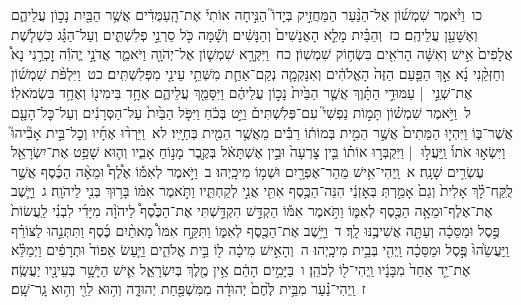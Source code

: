 \documentclass[18pt]{article}
\newcommand{\kri}[1]{\Afootnote{#1}}	%
\begin{document}
 {\loc כו~}וַיֹּ֨אמֶר שִׁמְשׁ֜וֹן אֶל־הַנַּ֨עַר הַמַּחֲזִ֣יק בְּיָדוֹ֮ הַנִּ֣יחָה אוֹתִי֒  \edtext{(והימשני)}{\kri{קרי: וַהֲמִישֵׁ֙נִי֙}}  אֶת־הָֽעַמֻּדִ֔ים אֲשֶׁ֥ר הַבַּ֖יִת נָכ֣וֹן עֲלֵיהֶ֑ם וְאֶשָּׁעֵ֖ן עֲלֵיהֶֽם׃ \startlock
 {\loc כז~}וְהַבַּ֗יִת מָלֵ֤א הָאֲנָשִׁים֙ וְהַנָּשִׁ֔ים וְשָׁ֕מָּה כֹּ֖ל סַרְנֵ֣י פְלִשְׁתִּ֑ים וְעַל־הַגָּ֗ג כִּשְׁלֹ֤שֶׁת אֲלָפִים֙ אִ֣ישׁ וְאִשָּׁ֔ה הָרֹאִ֖ים בִּשְׂח֥וֹק שִׁמְשֽׁוֹן׃ \startlock
 {\loc כח~}וַיִּקְרָ֥א שִׁמְשׁ֛וֹן אֶל־יְהֹוָ֖ה וַיֹּאמַ֑ר אֲדֹנָ֣י יֱהֹוִ֡ה זׇכְרֵ֣נִי נָא֩ וְחַזְּקֵ֨נִי נָ֜א אַ֣ךְ הַפַּ֤עַם הַזֶּה֙ הָאֱלֹהִ֔ים וְאִנָּקְמָ֧ה נְקַם־אַחַ֛ת מִשְּׁתֵ֥י עֵינַ֖י מִפְּלִשְׁתִּֽים׃ \startlock
 {\loc כט~}וַיִּלְפֹּ֨ת שִׁמְשׁ֜וֹן אֶת־שְׁנֵ֣י  |  עַמּוּדֵ֣י הַתָּ֗וֶךְ אֲשֶׁ֤ר הַבַּ֙יִת֙ נָכ֣וֹן עֲלֵיהֶ֔ם וַיִּסָּמֵ֖ךְ עֲלֵיהֶ֑ם אֶחָ֥ד בִּימִינ֖וֹ וְאֶחָ֥ד בִּשְׂמֹאלֽוֹ׃ \startlock
 {\loc ל~}וַיֹּ֣אמֶר שִׁמְשׁ֗וֹן תָּמ֣וֹת נַפְשִׁי֮ עִם־פְּלִשְׁתִּים֒ וַיֵּ֣ט בְּכֹ֔חַ וַיִּפֹּ֤ל הַבַּ֙יִת֙ עַל־הַסְּרָנִ֔ים וְעַל־כׇּל־הָעָ֖ם אֲשֶׁר־בּ֑וֹ וַיִּהְי֤וּ הַמֵּתִים֙ אֲשֶׁ֣ר הֵמִ֣ית בְּמוֹת֔וֹ רַבִּ֕ים מֵאֲשֶׁ֥ר הֵמִ֖ית בְּחַיָּֽיו׃ \startlock
 {\loc לא~}וַיֵּרְד֨וּ אֶחָ֜יו וְכׇל־בֵּ֣ית אָבִ֘יהוּ֮ וַיִּשְׂא֣וּ אֹתוֹ֒ וַֽיַּעֲל֣וּ  |  וַיִּקְבְּר֣וּ אוֹת֗וֹ בֵּ֤ין צׇרְעָה֙ וּבֵ֣ין אֶשְׁתָּאֹ֔ל בְּקֶ֖בֶר מָנ֣וֹחַ אָבִ֑יו וְה֛וּא שָׁפַ֥ט אֶת־יִשְׂרָאֵ֖ל עֶשְׂרִ֥ים שָׁנָֽה׃ 
\startlock
 {\loc א~}וַֽיְהִי־אִ֥ישׁ מֵהַר־אֶפְרָ֖יִם וּשְׁמ֥וֹ מִיכָֽיְהוּ׃ \startlock
 {\loc ב~}וַיֹּ֣אמֶר לְאִמּ֡וֹ אֶ֩לֶף֩ וּמֵאָ֨ה הַכֶּ֜סֶף אֲשֶׁ֣ר לֻֽקַּֽח־לָ֗ךְ  \edtext{(ואתי)}{\kri{קרי: וְאַ֤תְּ}}  אָלִית֙ וְגַם֙ אָמַ֣רְתְּ בְּאׇזְנַ֔י הִנֵּה־הַכֶּ֥סֶף אִתִּ֖י אֲנִ֣י לְקַחְתִּ֑יו וַתֹּ֣אמֶר אִמּ֔וֹ בָּר֥וּךְ בְּנִ֖י לַיהֹוָֽה׃ \startlock
 {\loc ג~}וַיָּ֛שֶׁב אֶת־אֶלֶף־וּמֵאָ֥ה הַכֶּ֖סֶף לְאִמּ֑וֹ וַתֹּ֣אמֶר אִמּ֡וֹ הַקְדֵּ֣שׁ הִקְדַּ֣שְׁתִּי אֶת־הַכֶּ֩סֶף֩ לַיהֹוָ֨ה מִיָּדִ֜י לִבְנִ֗י לַֽעֲשׂוֹת֙ פֶּ֣סֶל וּמַסֵּכָ֔ה וְעַתָּ֖ה אֲשִׁיבֶ֥נּוּ לָֽךְ׃ \startlock
 {\loc ד~}וַיָּ֥שֶׁב אֶת־הַכֶּ֖סֶף לְאִמּ֑וֹ וַתִּקַּ֣ח אִמּוֹ֩ מָאתַ֨יִם כֶּ֜סֶף וַתִּתְּנֵ֣הוּ לַצּוֹרֵ֗ף וַֽיַּעֲשֵׂ֙הוּ֙ פֶּ֣סֶל וּמַסֵּכָ֔ה וַֽיְהִ֖י בְּבֵ֥ית מִיכָֽיְהוּ׃ \startlock
 {\loc ה~}וְהָאִ֣ישׁ מִיכָ֔ה ל֖וֹ בֵּ֣ית אֱלֹהִ֑ים וַיַּ֤עַשׂ אֵפוֹד֙ וּתְרָפִ֔ים וַיְמַלֵּ֗א אֶת־יַ֤ד אַחַד֙ מִבָּנָ֔יו וַֽיְהִי־ל֖וֹ לְכֹהֵֽן׃ \startlock
 {\loc ו~}בַּיָּמִ֣ים הָהֵ֔ם אֵ֥ין מֶ֖לֶךְ בְּיִשְׂרָאֵ֑ל אִ֛ישׁ הַיָּשָׁ֥ר בְּעֵינָ֖יו יַעֲשֶֽׂה׃ \startlock
 {\loc ז~}וַֽיְהִי־נַ֗עַר מִבֵּ֥ית לֶ֙חֶם֙ יְהוּדָ֔ה מִמִּשְׁפַּ֖חַת יְהוּדָ֑ה וְה֥וּא לֵוִ֖י וְה֥וּא גָֽר־שָֽׁם׃ \startlock
\end{document}

